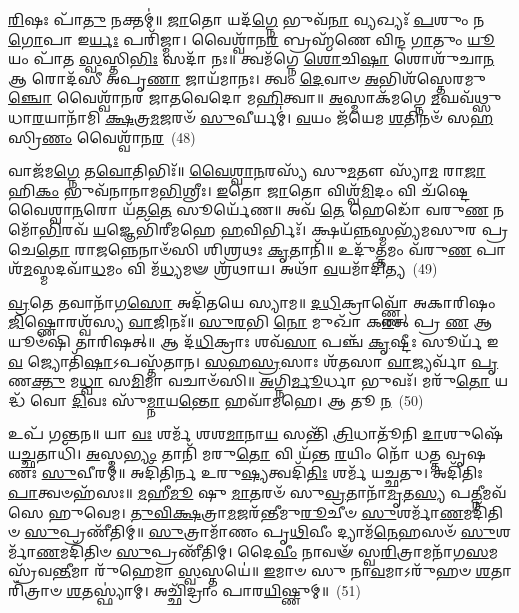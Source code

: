 \-\ul{𑌰𑌿}\-𑌷𑌃 𑌪𑌾᳴\-\ul{𑌤𑍁} 𑌨𑌕𑍍𑌤𑌮𑍍॑॥ \ul{𑌜𑌾}\-𑌤𑍋 𑌯𑌦᳴\-\ul{𑌗𑍍𑌨𑍇} 𑌭𑍁𑌵᳴\-\ul{𑌨𑌾} 𑌵𑍍𑌯𑌖𑍍𑌯𑌃᳴ \ul{𑌪}\-𑌶𑍁𑌂 𑌨 \ul{𑌗𑍋}\-𑌪𑌾 𑌇\-\ul{𑌰𑍍𑌯𑌃} 𑌪𑌰𑌿᳴𑌜𑍍𑌮𑌾। 𑌵𑍈𑌶𑍍𑌵𑌾᳴𑌨\-\ul{𑌰} 𑌬𑍍𑌰𑌹𑍍𑌮᳴𑌣𑍇 𑌵𑌿𑌨𑍍𑌦 \ul{𑌗𑌾}\-𑌤𑍁𑌂 \ul{𑌯𑍂}\-𑌯𑌂 𑌪𑌾᳴𑌤 \ul{𑌸𑍍𑌵}\-𑌸𑍍𑌤𑌿\-\ul{𑌭𑌿𑌃} 𑌸𑌦𑌾᳴ 𑌨𑌃॥ 𑌤𑍍𑌵𑌮᳴𑌗𑍍𑌨𑍇 \ul{𑌶𑍋}\-𑌚𑌿\-\ul{𑌷𑌾} 𑌶𑍋𑌶𑍁᳴𑌚𑌾\-\ul{𑌨} 𑌆 𑌰𑍋𑌦᳴𑌸𑍀 𑌅𑌪𑍃\-\ul{𑌣𑌾} 𑌜𑌾𑌯᳴𑌮𑌾𑌨𑌃। 𑌤𑍍𑌵𑌂 \ul{𑌦𑍇}\-𑌵𑌾𑍞 \ul{𑌅}\-𑌭𑌿𑌶᳴𑌸𑍍𑌤𑍇𑌰𑌮𑍁\-\ul{𑌞𑍍𑌚𑍋} 𑌵𑍈𑌶𑍍𑌵𑌾᳴𑌨𑌰 𑌜𑌾𑌤𑌵𑍇𑌦𑍋 𑌮\-\ul{𑌹𑌿}\-𑌤𑍍𑌵𑌾॥ \ul{𑌅}\-𑌸𑍍𑌮𑌾𑌕᳴𑌮𑌗𑍍𑌨𑍇 \ul{𑌮}\-𑌘𑌵᳴𑌥𑍍𑌸𑍁 𑌧𑌾\-\ul{𑌰}\-𑌯𑌾𑌨𑌾᳴𑌮𑌿 \ul{𑌕𑍍𑌷}\-𑌤𑍍𑌰\-\ul{𑌮}\-𑌜𑌰𑍞᳴ \ul{𑌸𑍁}\-𑌵𑍀𑌰𑍍𑌯𑌮𑍍॑। \ul{𑌵}\-𑌯𑌂 𑌜᳴𑌯𑍇𑌮 \ul{𑌶}\-𑌤𑌿𑌨𑍞᳴ 𑌸\-\ul{𑌹}\-𑌸𑍍𑌰𑌿\-\ul{𑌣𑌂} 𑌵𑍈𑌶𑍍𑌵𑌾᳴𑌨\-\ul{𑌰}\-~(48)

𑌵𑌾𑌜᳴𑌮\-\ul{𑌗𑍍𑌨𑍇} 𑌤\-\ul{𑌵𑍋}\-𑌤𑌿𑌭𑌿𑌃᳴॥ \ul{𑌵𑍈}\-\-\ul{𑌶𑍍𑌵𑌾}\-\-\ul{𑌨}\-𑌰𑌸𑍍𑌯᳴ 𑌸𑍁\-\ul{𑌮}\-𑌤𑍗 𑌸𑍍𑌯𑌾᳴\-\ul{𑌮} 𑌰𑌾\-\ul{𑌜𑌾} 𑌹𑌿\-\ul{𑌕𑌂} 𑌭𑍁𑌵᳴𑌨𑌾𑌨𑌾𑌮\-\ul{𑌭𑌿}\-𑌶𑍍𑌰𑍀𑌃। \ul{𑌇}\-𑌤𑍋 \ul{𑌜𑌾}\-𑌤𑍋 𑌵𑌿𑌶𑍍𑌵᳴\-\ul{𑌮𑌿}\-𑌦𑌂 𑌵𑌿 𑌚᳴𑌷𑍍𑌟𑍇 𑌵𑍈𑌶𑍍𑌵𑌾\-\ul{𑌨}\-𑌰𑍋 𑌯᳴𑌤\-\ul{𑌤𑍇} 𑌸𑍂𑌰𑍍𑌯𑍇᳴𑌣॥ 𑌅𑌵᳴ \ul{𑌤𑍇} 𑌹𑍇𑌡𑍋᳴ 𑌵𑌰𑍁\-\ul{𑌣} 𑌨𑌮𑍋᳴\-\-\ul{𑌭𑌿}\-𑌰𑌵᳴ \ul{𑌯}\-𑌜𑍍𑌞𑍇𑌭𑌿᳴𑌰𑍀𑌮𑌹𑍇 \ul{𑌹}\-𑌵𑌿𑌰𑍍𑌭𑌿𑌃᳴। 𑌕𑍍𑌷𑌯᳴\-\ul{𑌨𑍍𑌨}\-𑌸𑍍𑌮𑌭𑍍𑌯᳴𑌮𑌸𑍁𑌰 𑌪𑍍𑌰𑌚𑍇\-\ul{𑌤𑍋} 𑌰𑌾\-\ul{𑌜}\-𑌨𑍍𑌨𑍇𑌨𑌾𑍞᳴𑌸𑌿 𑌶𑌿𑌶𑍍𑌰𑌥𑌃 \ul{𑌕𑍃}\-𑌤𑌾𑌨𑌿᳴॥ 𑌉𑌦𑍁᳴\-\ul{𑌤𑍍𑌤}\-𑌮𑌂 𑌵᳴𑌰𑍁\-\ul{𑌣} 𑌪𑌾𑌶᳴\-\-\ul{𑌮}\-𑌸𑍍𑌮𑌦\-𑌵𑌾᳴\-\ul{𑌧}\-𑌮𑌂 𑌵𑌿 𑌮᳴\-\ul{𑌧𑍍𑌯}\-𑌮𑍟 𑌶𑍍𑌰᳴𑌥𑌾𑌯। 𑌅𑌥𑌾᳴ \ul{𑌵}\-𑌯𑌮𑌾᳴𑌦𑌿𑌤𑍍𑌯~(49)

\-\ul{𑌵𑍍𑌰}\-𑌤𑍇 𑌤𑌵𑌾𑌨𑌾᳴𑌗\-\ul{𑌸𑍋} 𑌅𑌦𑌿᳴𑌤𑌯𑍇 𑌸𑍍𑌯𑌾𑌮॥ \ul{𑌦}\-\-\ul{𑌧𑌿}\-𑌕𑍍𑌰𑌾𑌵𑍍𑌣𑍍𑌣𑍋᳴ 𑌅𑌕𑌾𑌰𑌿𑌷𑌂 \ul{𑌜𑌿}\-𑌷𑍍𑌣𑍋𑌰𑌶𑍍𑌵᳴𑌸𑍍𑌯 \ul{𑌵𑌾}\-𑌜𑌿𑌨𑌃᳴॥ \ul{𑌸𑍁}\-\-\ul{𑌰}\-𑌭𑌿 \ul{𑌨𑍋} 𑌮𑍁𑌖𑌾᳴ 𑌕\-\ul{𑌰}\-𑌤𑍍 𑌪𑍍𑌰 \ul{𑌣} 𑌆𑌯𑍂𑍞᳴𑌷𑌿 𑌤𑌾𑌰𑌿𑌷𑌤𑍍॥ 𑌆 𑌦᳴\-\ul{𑌧𑌿}\-𑌕𑍍𑌰𑌾𑌃 𑌶𑌵᳴\-\ul{𑌸𑌾} 𑌪𑌞𑍍𑌚᳴ \ul{𑌕𑍃}\-𑌷𑍍𑌟𑍀𑌃 𑌸𑍂𑌰𑍍𑌯᳴ 𑌇\-\ul{𑌵} 𑌜𑍍𑌯𑍋𑌤𑌿᳴\-\ul{𑌷𑌾}\-\-𑌽𑌪𑌸𑍍𑌤᳴𑌤𑌾𑌨। \ul{𑌸}\-\-\ul{𑌹}\-\-\ul{𑌸𑍍𑌰}\-𑌸𑌾𑌃 𑌶᳴\-\ul{𑌤}\-𑌸𑌾 \ul{𑌵𑌾}\-𑌜𑍍𑌯𑌰𑍍𑌵𑌾᳴ \ul{𑌪𑍃}\-𑌣\-\ul{𑌕𑍍𑌤𑍁} 𑌮\-\ul{𑌧𑍍𑌵𑌾} 𑌸\-\ul{𑌮𑌿}\-𑌮𑌾 𑌵𑌚𑌾𑍞᳴𑌸𑌿॥ \ul{𑌅}\-𑌗𑍍𑌨𑌿\-\ul{𑌰𑍍𑌮𑍂}\-𑌰𑍍𑌧𑌾 𑌭𑍁𑌵𑌃᳴। 𑌮𑌰𑍁᳴\-\ul{𑌤𑍋} 𑌯𑌦𑍍𑌧᳴ 𑌵𑍋 \ul{𑌦𑌿}\-𑌵𑌃 𑌸𑍁᳴\-\ul{𑌮𑍍𑌨𑌾}\-𑌯\-\ul{𑌨𑍍𑌤𑍋} 𑌹𑌵𑌾᳴𑌮𑌹𑍇। 𑌆 𑌤𑍂 \ul{𑌨}\-~(50)

𑌉𑌪᳴ 𑌗𑌨𑍍𑌤𑌨॥ 𑌯𑌾 \ul{𑌵𑌃} 𑌶𑌰𑍍𑌮᳴ 𑌶𑌶\-\ul{𑌮𑌾}\-𑌨𑌾\-\ul{𑌯} 𑌸𑌨𑍍𑌤𑌿᳴ \ul{𑌤𑍍𑌰𑌿}\-𑌧𑌾𑌤𑍂᳴𑌨𑌿 \ul{𑌦𑌾}\-𑌶𑍁𑌷𑍇᳴ 𑌯\-\ul{𑌚𑍍𑌛}\-𑌤𑌾𑌧𑌿᳴। \ul{𑌅}\-𑌸𑍍𑌮\-\ul{𑌭𑍍𑌯𑌂} 𑌤𑌾𑌨𑌿᳴ 𑌮𑌰𑍁\-\ul{𑌤𑍋} 𑌵𑌿 𑌯᳴𑌨𑍍𑌤 \ul{𑌰}\-𑌯𑌿𑌂 𑌨𑍋᳴ 𑌧𑌤𑍍𑌤 𑌵𑍃𑌷𑌣𑌃 \ul{𑌸𑍁}\-𑌵𑍀𑌰𑌮𑍍॑॥ 𑌅𑌦𑌿᳴𑌤𑌿𑌰𑍍𑌨 𑌉𑌰𑍁\-\ul{𑌷𑍍𑌯}\-𑌤𑍍𑌵𑌦𑌿᳴\-\ul{𑌤𑌿𑌃} 𑌶𑌰𑍍𑌮᳴ 𑌯𑌚𑍍𑌛𑌤𑍁। 𑌅𑌦𑌿᳴𑌤𑌿𑌃 \ul{𑌪𑌾}\-𑌤𑍍𑌵𑍞𑌹᳴𑌸𑌃॥ \ul{𑌮}\-𑌹𑍀\-\ul{𑌮𑍂} 𑌷𑍁 \ul{𑌮𑌾}\-𑌤𑌰𑍞᳴ 𑌸𑍁\-\ul{𑌵𑍍𑌰}\-𑌤𑌾\-𑌨𑌾᳴\-\-\ul{𑌮𑍃}\-𑌤\-\ul{𑌸𑍍𑌯} 𑌪\-\ul{𑌤𑍍𑌨𑍀}\-𑌮𑌵᳴𑌸𑍇 𑌹𑍁𑌵𑍇𑌮। \ul{𑌤𑍁}\-\-\ul{𑌵𑌿}\-\-\ul{𑌕𑍍𑌷}\-𑌤𑍍𑌰𑌾\-\-\ul{𑌮}\-𑌜𑌰᳴𑌨𑍍𑌤𑍀\-𑌮𑍁\-\ul{𑌰𑍂}\-𑌚𑍀𑍞 \ul{𑌸𑍁}\-𑌶𑌰𑍍𑌮𑌾᳴\-\ul{𑌣}\-𑌮𑌦𑌿᳴𑌤𑌿𑍞 \ul{𑌸𑍁}\-𑌪𑍍𑌰𑌣𑍀᳴𑌤𑌿𑌮𑍍॥ \ul{𑌸𑍁}\-𑌤𑍍𑌰𑌾𑌮𑌾᳴𑌣𑌂 𑌪𑍃\-\ul{𑌥𑌿}\-𑌵𑍀𑌂 𑌦𑍍𑌯𑌾𑌮᳴\-\ul{𑌨𑍇}\-𑌹𑌸𑍞᳴ \ul{𑌸𑍁}\-𑌶𑌰𑍍𑌮𑌾᳴\-\ul{𑌣}\-𑌮𑌦𑌿᳴𑌤𑌿𑍞 \ul{𑌸𑍁}\-𑌪𑍍𑌰𑌣𑍀᳴𑌤𑌿𑌮𑍍। 𑌦𑍈\-\ul{𑌵𑍀𑌂} 𑌨𑌾𑌵𑍟᳴ 𑌸𑍍𑌵\-\ul{𑌰𑌿}\-𑌤𑍍𑌰𑌾\-𑌮𑌨𑌾᳴\-𑌗\-\ul{𑌸}\-𑌮𑌸𑍍𑌰᳴𑌵\-\ul{𑌨𑍍𑌤𑍀}\-𑌮𑌾 𑌰𑍁᳴𑌹𑍇𑌮𑌾 \ul{𑌸𑍍𑌵}\-𑌸𑍍𑌤𑌯𑍇॑॥ \ul{𑌇}\-𑌮𑌾𑍞 𑌸𑍁 𑌨𑌾\-\ul{𑌵}\-𑌮𑌾\-𑌽𑌰𑍁᳴𑌹𑍞 \ul{𑌶}\-𑌤𑌾𑌰𑌿᳴𑌤𑍍𑌰𑌾𑍞 \ul{𑌶}\-𑌤𑌸𑍍𑌫𑍍𑌯𑌾॑𑌮𑍍। 𑌅𑌚𑍍𑌛𑌿᳴𑌦𑍍𑌰𑌾𑌂 𑌪𑌾𑌰\-\ul{𑌯𑌿}\-𑌷𑍍𑌣𑍁𑌮𑍍॥~(51)

